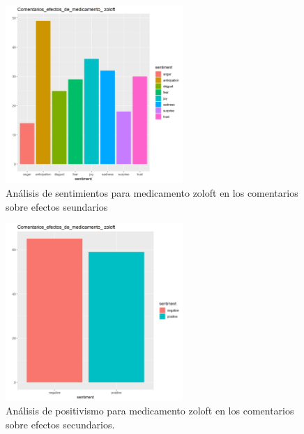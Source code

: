\documentclass[spanish,]{article}
\begin{document}
\begin{figure}[h]
    \centering
    \includegraphics[width=0.6\textwidth]{figuras/sentimientos/Bzoloft1.png}
    \caption{Análisis de sentimientos para medicamento zoloft en los comentarios sobre efectos seundarios}
    \label{fig:sentimientos:46}
\end{figure}

\begin{figure}[h]
    \centering
    \includegraphics[width=0.6\textwidth]{figuras/sentimientos/Bzoloft2.png}
    \caption{Análisis de positivismo para medicamento zoloft en los comentarios sobre efectos secundarios.}
    \label{fig:sentimientos:47}
\end{figure}
\end{document}

